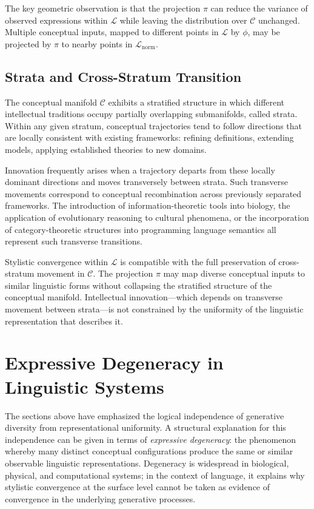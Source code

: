 \documentclass[12pt,a4paper]{article}
\theoremstyle{definition}
\theoremstyle{plain}
\theoremstyle{remark}
\newcommand{\calL}{\mathcal{L}}
\newcommand{\calC}{\mathcal{C}}
\begin{document}
The key geometric observation is that the projection $\pi$ can reduce the variance of
observed expressions within $\calL$ while leaving the distribution over $\calC$ unchanged.
Multiple conceptual inputs, mapped to different points in $\calL$ by $\phi$, may be
projected by $\pi$ to nearby points in $\calL_{\mathrm{norm}}$.

\subsection{Strata and Cross-Stratum Transition}

The conceptual manifold $\calC$ exhibits a stratified structure in which different
intellectual traditions occupy partially overlapping submanifolds, called strata. Within
any given stratum, conceptual trajectories tend to follow directions that are locally
consistent with existing frameworks: refining definitions, extending models, applying
established theories to new domains.

Innovation frequently arises when a trajectory departs from these locally dominant directions
and moves transversely between strata. Such transverse movements correspond to conceptual
recombination across previously separated frameworks. The introduction of information-theoretic
tools into biology, the application of evolutionary reasoning to cultural phenomena, or the
incorporation of category-theoretic structures into programming language semantics all
represent such transverse transitions.

Stylistic convergence within $\calL$ is compatible with the full preservation of cross-stratum
movement in $\calC$. The projection $\pi$ may map diverse conceptual inputs to similar
linguistic forms without collapsing the stratified structure of the conceptual manifold.
Intellectual innovation---which depends on transverse movement between strata---is not
constrained by the uniformity of the linguistic representation that describes it.

\section{Expressive Degeneracy in Linguistic Systems}
\label{sec:degeneracy}

The sections above have emphasized the logical independence of generative diversity from
representational uniformity. A structural explanation for this independence can be given in
terms of \emph{expressive degeneracy}: the phenomenon whereby many distinct conceptual
configurations produce the same or similar observable linguistic representations. Degeneracy
is widespread in biological, physical, and computational systems; in the context of language,
it explains why stylistic convergence at the surface level cannot be taken as evidence of
convergence in the underlying generative processes.
\end{document}
